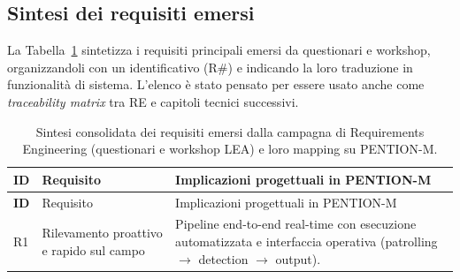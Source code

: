 \subsection{Sintesi dei requisiti emersi}
\label{subsec:requirements_summary}

La Tabella~\ref{tab:requirements} sintetizza i requisiti principali emersi da questionari e workshop, organizzandoli con un identificativo (R\#) e indicando la loro traduzione in funzionalità di sistema.
L'elenco è stato pensato per essere usato anche come \emph{traceability matrix} tra RE e capitoli tecnici successivi.

\renewcommand{\arraystretch}{1.25}

\begin{longtable}{>{\bfseries}p{1cm} p{4cm} p{7cm}}
    \caption{Sintesi consolidata dei requisiti emersi dalla campagna di Requirements Engineering (questionari e workshop LEA) e loro mapping su PENTION-M.}
    \label{tab:requirements}                                                                                                                                                                                                                                                                                                                                                                                                                      \\
    \toprule
    ID  & Requisito                                         & Implicazioni progettuali in PENTION-M                                                                                                                                                                                                                                                                                                                                                 \\
    \midrule
    \endfirsthead

    \toprule
    ID  & Requisito                                         & Implicazioni progettuali in PENTION-M                                                                                                                                                                                                                                                                                                                                                 \\
    \midrule
    \endhead

    R1  & Rilevamento proattivo e rapido sul campo          &
    Pipeline end-to-end real-time con esecuzione automatizzata e interfaccia operativa (patrolling $\rightarrow$ detection $\rightarrow$ output).                                                                                                                                                                                                                                                                                                  \\


\end{longtable}
